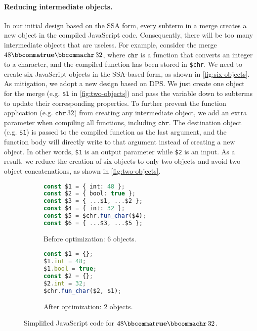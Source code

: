 \paragraph{Reducing intermediate objects.}
In our initial design based on the SSA form, every subterm in a merge creates a
new object in the compiled JavaScript code. Consequently, there will be too many
intermediate objects that are useless. For example, consider the merge
$48  \bbcomma   \mathbf{true}   \bbcomma   \mathtt{chr}  \, 32$, where $ \mathtt{chr} $ is a function that converts an
integer to a character, and the compiled function has been stored in
\lstinline{$chr}. We need to create six JavaScript objects in the SSA-based
form, as shown in \autoref{fig:six-objects}. As mitigation, we adopt a new
design based on DPS. We just create one object for the merge (e.g.
\lstinline{$1} in \autoref{fig:two-objects}) and pass the variable down to
subterms to update their corresponding properties. To further prevent the
function application (e.g. $ \mathtt{chr}  \, 32$) from creating any intermediate object,
we add an extra parameter when compiling all functions, including $ \mathtt{chr} $. The
destination object (e.g. \lstinline{$1}) is passed to the compiled function as
the last argument, and the function body will directly write to that argument
instead of creating a new object. In other words, \lstinline{$1} is an output
parameter while \lstinline{$2} is an input. As a result, we reduce the creation
of six objects to only two objects and avoid two object concatenations, as shown
in \autoref{fig:two-objects}.

\begin{figure}
\centering
\begin{subfigure}{.37\textwidth}
\begin{lstlisting}[language=TypeScript]
const $1 = { int: 48 };
const $2 = { bool: true };
const $3 = { ...$1, ...$2 };
const $4 = { int: 32 };
const $5 = $chr.fun_char($4);
const $6 = { ...$3, ...$5 };
\end{lstlisting}
\caption{Before optimization: 6 objects.} \label{fig:six-objects}
\end{subfigure}%
\hspace{.1\textwidth}%
\begin{subfigure}{.33\textwidth}
\begin{lstlisting}[language=TypeScript]
const $1 = {};
$1.int = 48;
$1.bool = true;
const $2 = {};
$2.int = 32;
$chr.fun_char($2, $1);
\end{lstlisting}
\caption{After optimization: 2 objects.} \label{fig:two-objects}
\end{subfigure}
\caption{Simplified JavaScript code for $48  \bbcomma   \mathbf{true}   \bbcomma   \mathtt{chr}  \, 32$.}
\end{figure}

